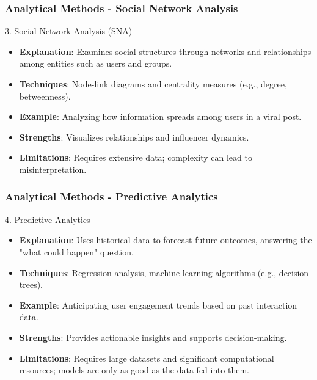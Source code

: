 \documentclass{beamer}
\begin{document}
\begin{frame}[fragile]
    \frametitle{Analytical Methods - Social Network Analysis}
    \begin{block}{3. Social Network Analysis (SNA)}
        \begin{itemize}
            \item \textbf{Explanation}: Examines social structures through networks and relationships among entities such as users and groups.
            \item \textbf{Techniques}: Node-link diagrams and centrality measures (e.g., degree, betweenness).
            \item \textbf{Example}: Analyzing how information spreads among users in a viral post.
            \item \textbf{Strengths}: Visualizes relationships and influencer dynamics.
            \item \textbf{Limitations}: Requires extensive data; complexity can lead to misinterpretation.
        \end{itemize}
    \end{block}
\end{frame}

\begin{frame}[fragile]
    \frametitle{Analytical Methods - Predictive Analytics}
    \begin{block}{4. Predictive Analytics}
        \begin{itemize}
            \item \textbf{Explanation}: Uses historical data to forecast future outcomes, answering the "what could happen" question.
            \item \textbf{Techniques}: Regression analysis, machine learning algorithms (e.g., decision trees).
            \item \textbf{Example}: Anticipating user engagement trends based on past interaction data.
            \item \textbf{Strengths}: Provides actionable insights and supports decision-making.
            \item \textbf{Limitations}: Requires large datasets and significant computational resources; models are only as good as the data fed into them.
        \end{itemize}
    \end{block}
\end{frame}
\end{document}
